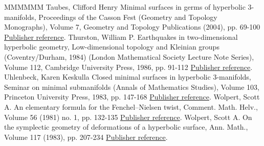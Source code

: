 \begin{thebibliography}{MMMMMM}
 Taubes, Clifford Henry Minimal surfaces in germs of hyperbolic 3-manifolds, Proceedings of the Casson Fest (Geometry and Topology Monographs), Volume 7, Geometry and Topology Publications (2004), pp. 69-100 \href{https://ahl.centre-mersenne.org/item/AHL_2020__3__873_0/#taubes}{Publisher reference}.
 Thurston, William P. Earthquakes in two-dimensional hyperbolic geometry, Low-dimensional topology and Kleinian groups (Coventry/Durham, 1984) (London Mathematical Society Lecture Note Series), Volume 112, Cambridge University Press, 1986, pp. 91-112 \href{https://ahl.centre-mersenne.org/item/AHL_2020__3__873_0/#thurstonearth}{Publisher reference}.
 Uhlenbeck, Karen Keskulla Closed minimal surfaces in hyperbolic 3-manifolds, Seminar on minimal submanifolds (Annals of Mathematics Studies), Volume 103, Princeton University Press, 1983, pp. 147-168 \href{https://ahl.centre-mersenne.org/item/AHL_2020__3__873_0/#uhlenbeck}{Publisher reference}.
 Wolpert, Scott A. An elementary formula for the Fenchel–Nielsen twist, Comment. Math. Helv., Volume 56 (1981) no. 1, pp. 132-135 \href{https://ahl.centre-mersenne.org/item/AHL_2020__3__873_0/#wolpertelementary}{Publisher reference}.
 Wolpert, Scott A. On the symplectic geometry of deformations of a hyperbolic surface, Ann. Math., Volume 117 (1983), pp. 207-234 \href{https://ahl.centre-mersenne.org/item/AHL_2020__3__873_0/#wolpertformula}{Publisher reference}.
\end{thebibliography}
